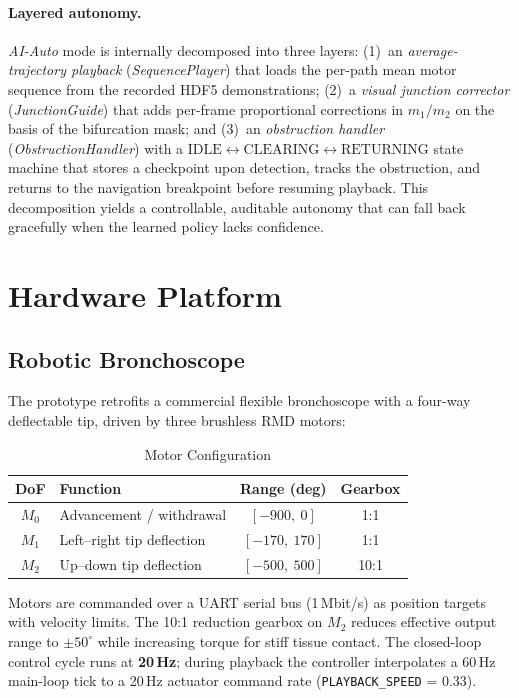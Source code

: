 \documentclass[journal,comsoc]{IEEEtran}
\begin{document}
\paragraph{Layered autonomy.} \textit{AI-Auto} mode is internally
decomposed into three layers: (1)~an \emph{average-trajectory
playback} (\textit{SequencePlayer}) that loads the per-path mean
motor sequence from the recorded HDF5 demonstrations; (2)~a
\emph{visual junction corrector} (\textit{JunctionGuide}) that adds
per-frame proportional corrections in $m_1/m_2$ on the basis of the
bifurcation mask; and (3)~an \emph{obstruction handler}
(\textit{ObstructionHandler}) with a
$\text{IDLE}\!\leftrightarrow\!\text{CLEARING}\!\leftrightarrow\!\text{RETURNING}$
state machine that stores a checkpoint upon detection, tracks the
obstruction, and returns to the navigation breakpoint before
resuming playback. This decomposition yields a controllable,
auditable autonomy that can fall back gracefully when the learned
policy lacks confidence.

\section{Hardware Platform}
\label{sec:hardware}

\subsection{Robotic Bronchoscope}
The prototype retrofits a commercial flexible bronchoscope with a
four-way deflectable tip, driven by three brushless RMD motors:

\begin{table}[h]
\caption{Motor Configuration}
\label{tab:motors}
\centering
\begin{tabular}{clcc}
\toprule
DoF & Function & Range (deg) & Gearbox \\
\midrule
$M_0$ & Advancement / withdrawal  & $[-900,\ 0]$   & 1:1  \\
$M_1$ & Left–right tip deflection & $[-170,\ 170]$ & 1:1  \\
$M_2$ & Up–down tip deflection    & $[-500,\ 500]$ & 10:1 \\
\bottomrule
\end{tabular}
\end{table}

Motors are commanded over a UART serial bus (1\,Mbit/s) as position
targets with velocity limits. The 10:1 reduction gearbox on $M_2$
reduces effective output range to $\pm 50^\circ$ while increasing
torque for stiff tissue contact. The closed-loop control cycle runs
at \textbf{20\,Hz}; during playback the controller interpolates a
60\,Hz main-loop tick to a 20\,Hz actuator command rate
(\texttt{PLAYBACK\_SPEED} = 0.33).
\end{document}
